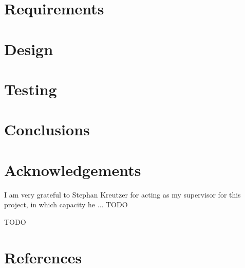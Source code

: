 \documentclass[11pt]{article}
\begin{document}
\section{Requirements}

\section{Design}

\section{Testing}

\section{Conclusions}

\section{Acknowledgements}

I am very grateful to Stephan Kreutzer for acting as my supervisor for this project, in which capacity he ... TODO

TODO

\section{References}
{}

\end{document}
